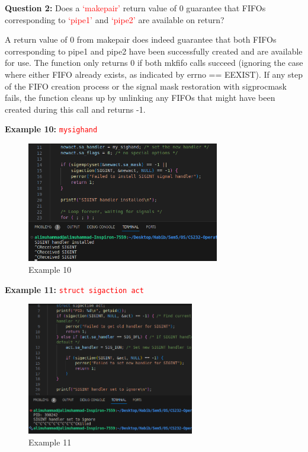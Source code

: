 \documentclass[addpoints]{exam}
\begin{document}
\begin{questions}
    \question
    \textbf{Question 2:} Does a \textcolor{red}{`makepair'} return value of 0 guarantee that FIFOs corresponding to \textcolor{red}{`pipe1'} and \textcolor{red}{`pipe2'} are available on return?
    \begin{solution}
        A return value of 0 from makepair does indeed guarantee that both FIFOs corresponding to pipe1 and pipe2 have been successfully created and are available for use. The function only returns 0 if both mkfifo calls succeed (ignoring the case where either FIFO already exists, as indicated by errno == EEXIST). If any step of the FIFO creation process or the signal mask restoration with sigprocmask fails, the function cleans up by unlinking any FIFOs that might have been created during this call and returns -1.
    \end{solution}
    
    
    \question
    \textbf{Example 10:} \texttt{\textcolor{red}{mysighand}}
    \begin{figure}[H]
        \centering
        \includegraphics[width=0.75\textwidth]{eg10.png}
        \caption*{Example 10}
    \end{figure}
    \pagebreak
    \question
    \textbf{Example 11:} \texttt{\textcolor{red}{struct sigaction act}}
    \begin{figure}[H]
        \centering
        \includegraphics[width=0.65\textwidth]{eg11.png}
        \caption*{Example 11}
    \end{figure}


\end{questions}
\end{document}

